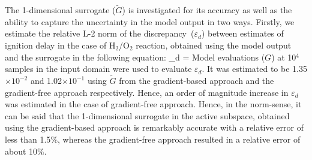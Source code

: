 The 1-dimensional surrogate ($\tilde{G}$) is investigated for its accuracy as well as the ability to capture the 
uncertainty in the
model output in two ways. Firstly, we estimate the relative L-2 norm of the discrepancy~($\varepsilon_d$)
between estimates of ignition delay in the case of H$_2$/O$_2$ reaction, obtained using the 
model output and the surrogate in the following equation:
%
\be
\varepsilon_d = 
\ee
%
Model evaluations ($G$) at 10$^{4}$ samples in the input domain were used to evaluate $\varepsilon_d$. 
It was estimated to be 1.35$\times10^{-2}$ and 1.02$\times10^{-1}$
using $\tilde{G}$ from the gradient-based approach and the gradient-free approach respectively. Hence,
an order of magnitude increase in $\varepsilon_d$ was estimated in the case of gradient-free approach.
Hence, in the norm-sense, it can be said that the 1-dimensional surrogate in the active subspace, obtained
using the gradient-based approach is remarkably accurate with a relative error of less than 1.5$\%$, whereas
the gradient-free approach resulted in a relative error of about 10$\%$.

